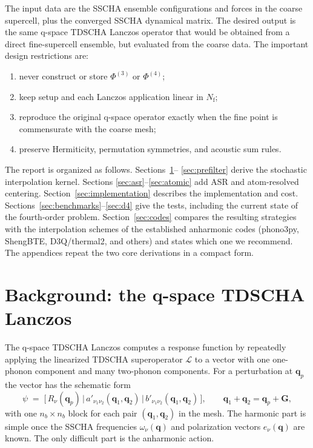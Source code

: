 \documentclass[11pt,a4paper]{article}
\newcommand{\qv}{\mathbf{q}}
\newcommand{\Nf}{N_{\mathrm{f}}}
\newcommand{\Ltdscha}{\mathcal{L}}
\newcommand{\nb}{n_b}
\begin{document}
The input data are the SSCHA ensemble configurations and forces in the
coarse supercell, plus the converged SSCHA dynamical matrix.  The desired
output is the same q-space TDSCHA Lanczos operator that would be obtained
from a direct fine-supercell ensemble, but evaluated from the coarse data.
The important design restrictions are:
\begin{enumerate}
\item never construct or store $\Phi^{(3)}$ or $\Phi^{(4)}$;
\item keep setup and each Lanczos application linear in $\Nf$;
\item reproduce the original q-space operator exactly when the fine point is
commensurate with the coarse mesh;
\item preserve Hermiticity, permutation symmetries, and acoustic sum rules.
\end{enumerate}

The report is organized as follows.  Sections~\ref{sec:background}--
\ref{sec:prefilter} derive the stochastic interpolation kernel.  Sections
\ref{sec:asr}--\ref{sec:atomic} add ASR and atom-resolved centering.
Section~\ref{sec:implementation} describes the implementation and cost.
Sections~\ref{sec:benchmarks}--\ref{sec:d4} give the tests, including the
current state of the fourth-order problem.  Section~\ref{sec:codes}
compares the resulting strategies with the interpolation schemes of the
established anharmonic codes (phono3py, ShengBTE, D3Q/thermal2, and
others) and states which one we recommend.  The appendices repeat the two
core derivations in a compact form.

\section{Background: the q-space TDSCHA Lanczos}
\label{sec:background}

The q-space TDSCHA Lanczos \cite{tdscha,qspace} computes a response
function by repeatedly applying the linearized TDSCHA superoperator
$\Ltdscha$ to a vector with one one-phonon component and many two-phonon
components.  For a perturbation at $\qv_p$ the vector has the schematic
form
\begin{equation}
\psi \;=\; \bigl[\, R_\nu(\qv_p) \,\big|\, a'_{\nu_1\nu_2}(\qv_1,\qv_2)
\,\big|\, b'_{\nu_1\nu_2}(\qv_1,\qv_2) \,\bigr],
\qquad \qv_1+\qv_2 = \qv_p + \mathbf{G},
\end{equation}
with one $\nb\times\nb$ block for each pair $(\qv_1,\qv_2)$ in the mesh.
The harmonic part is simple once the SSCHA frequencies
$\omega_\nu(\qv)$ and polarization vectors $e_\nu(\qv)$ are known.  The
only difficult part is the anharmonic action.
\end{document}
